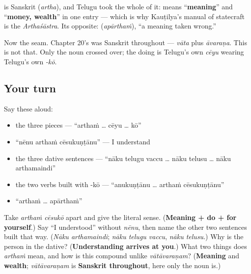 \begin{cousinweb}
\textbf{} is Sanskrit \textbf{} (\emph{artha}), and Telugu took the whole of it: \textbf{} means \textquotedblleft{}\textbf{meaning}\textquotedblright{} and \textquotedblleft{}\textbf{money, wealth}\textquotedblright{} in one entry — which is why Kauṭilya's manual of statecraft is the \emph{Arthaśāstra}. Its opposite: \textbf{} (\emph{apārthaṁ}), \textquotedblleft{}a meaning taken wrong.\textquotedblright{}

Now the seam. Chapter 20's \textbf{} was Sanskrit throughout — \emph{vāta} plus \emph{āvaraṇa}. This is not that. Only the noun crossed over; the doing is Telugu's own \emph{cēyu} wearing Telugu's own \emph{-kō}.
\end{cousinweb}

\subsection*{Your turn}
Say these aloud:

\begin{itemize}
\raggedright
  \item the three pieces — \textquotedblleft{}arthaṁ … cēyu … kō\textquotedblright{}
  \item \textquotedblleft{}nēnu arthaṁ cēsukuṇṭānu\textquotedblright{} — I understand
  \item the three dative sentences — \textquotedblleft{}nāku telugu vaccu … nāku telusu … nāku arthamaindi\textquotedblright{}
  \item the two verbs built with -kō — \textquotedblleft{}anukuṇṭānu … arthaṁ cēsukuṇṭānu\textquotedblright{}
  \item \textquotedblleft{}arthaṁ … apārthaṁ\textquotedblright{}
\end{itemize}

\begin{tcolorbox}[breakable,colback=teal!4,colframe=teal!35!black,title={Before you move on}]
Take \emph{arthaṁ cēsukō} apart and give the literal sense. (\textbf{Meaning + do + for yourself}.) Say \textquotedblleft{}I understood\textquotedblright{} without \emph{nēnu}, then name the other two sentences built that way. (\emph{Nāku arthamaindi}; \emph{nāku telugu vaccu}, \emph{nāku telusu}.) Why is the person in the dative? (\textbf{Understanding arrives at you}.) What two things does \emph{arthaṁ} mean, and how is this compound unlike \emph{vātāvaraṇam}? (\textbf{Meaning} and \textbf{wealth}; \emph{vātāvaraṇam} is \textbf{Sanskrit throughout}, here only the noun is.)
\end{tcolorbox}
